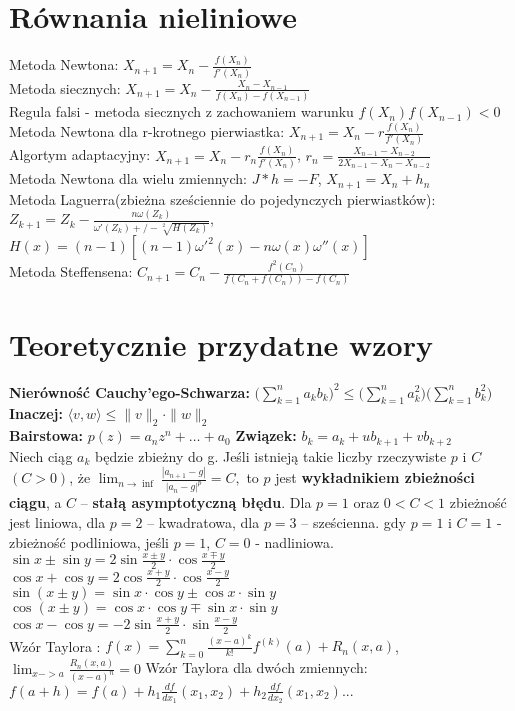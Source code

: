 \documentclass[a4paper,twocolumn]{article}
\begin{document}
\section{Równania nieliniowe}
Metoda Newtona: $X_{n+1}  = X_n - \frac{f(X_n)}{f'(X_n)}$\\
Metoda siecznych: $X_{n+1}  = X_n - \frac{X_n - X_{n-1}}{f(X_n)- f(X_{n-1})}$\\
Regula falsi - metoda siecznych z zachowaniem warunku $f(X_n)f(X_{n-1})<0$
Metoda Newtona dla r-krotnego pierwiastka: $X_{n+1}  = X_n - r\frac{f(X_n)}{f'(X_n)}$\\
Algortym adaptacyjny: $X_{n+1}  = X_n - r_n\frac{f(X_n)}{f'(X_n)}$, $r_n = \frac{X_{n-1} - X_{n-2}}{2X_{n-1} - X_n - X_{n-2}}$\\
Metoda Newtona dla wielu zmiennych: $J*h = -F$,  $X_{n+1} = X_n + h_n$\\
Metoda Laguerra(zbieżna sześciennie do pojedynczych pierwiastków): \\ $Z_{k+1} = Z_k - \frac{n\omega (Z_k)}{\omega '(Z_k) +/- \sqrt[2]{H(Z_k)}}$,\\ $H(x) = (n-1)[(n-1) \omega '^2(x) - n\omega (x) \omega ''(x)]$\\
Metoda Steffensena: $C_{n+1} = C_n - \frac{f^2(C_n)}{f(C_n + f(C_n)) - f(C_n)}$

\section{Teoretycznie przydatne wzory}

\textbf{Nierówność Cauchy'ego-Schwarza:} $ \Big(\sum_{k=1}^{n} a_k b_k\Big)^2 \leq \Big(\sum_{k=1}^{n} a_k^2\Big)\Big(\sum_{k=1}^{n} b_k^2\Big) $ \\
\textbf{Inaczej:} $\langle v, w\rangle \leq \|v\|_2\cdot \|w\|_2$\\
\textbf{Bairstowa:} $p(z)=a_nz^n+\dots+a_0$
\textbf{Związek:} $b_k=a_k+ub_{k+1}+vb_{k+2}$\\
Niech ciąg $a_k$ będzie zbieżny do g. Jeśli istnieją takie liczby rzeczywiste $p$ i $C$ $(C > 0)$, że
$\lim_{n \rightarrow \inf}{\frac{|{a_{n+1}-g}|}{|{a_n - g}|^p}} = C, $
to $p$ jest \textbf{wykładnikiem zbieżności ciągu}, a $C$ – \textbf{stałą
asymptotyczną błędu}. Dla $p = 1$ oraz $0 < C < 1$ zbieżność jest
liniowa, dla $p = 2$ – kwadratowa, dla $p = 3$ – sześcienna.
gdy $p = 1$ i $C = 1$ - zbieżność podliniowa, jeśli $p = 1$, $C = 0$ - nadliniowa.\\
${\displaystyle \sin x\pm \sin y=2\sin {\frac {x\pm y}{2}}\cdot \cos {\frac {x\mp y}{2}}} $\\
$\cos x+\cos y=2\cos {\frac  {x+y}2}\cdot \cos {\frac  {x-y}2}$\\
${\displaystyle \sin(x\pm y)=\sin x\cdot \cos y\pm \cos x\cdot \sin y}$\\
${\displaystyle \cos(x\pm y)=\cos x\cdot \cos y\mp \sin x\cdot \sin y} $\\
$\cos x-\cos y=-2\sin {\frac  {x+y}2}\cdot \sin {\frac  {x-y}2}$\\
Wzór Taylora : $f(x) = \sum_{k=0}^n \frac{(x-a)^k}{k!}f^{(k)}(a) + R_n(x, a)$, $\lim_{x->a} \frac{R_n(x, a)}{(x-a)^n} = 0$
Wzór Taylora dla dwóch zmiennych: $f(a + h) = f(a) + h_1 \frac{df}{dx_1}(x_1, x_2) + h_2 \frac{df}{dx_2}(x_1, x_2)... $\\
\end{document}
